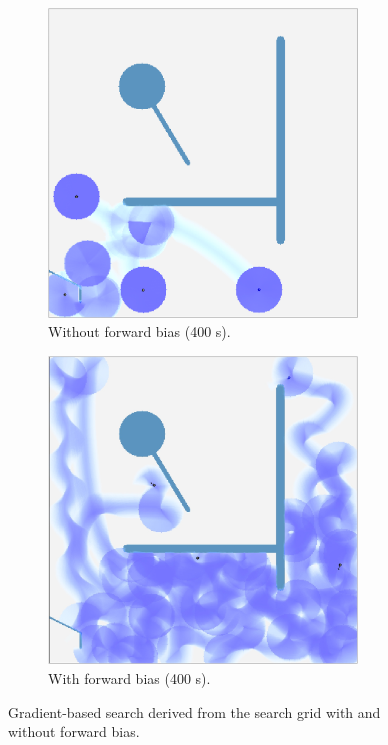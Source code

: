 \begin{figure}[H]
  \centering
  \begin{subfigure}[b]{0.45\textwidth}
    \centering
        \includegraphics[width=0.9\textwidth]{./figures/screenshots/without-forward.png}
    \caption{Without forward bias (400 s).}
    \label{fig:search-gradient-no-forward}
  \end{subfigure}
  \begin{subfigure}[b]{0.45\textwidth}
    \centering
    \includegraphics[width=0.9\textwidth]{./figures/screenshots/with-forward.jpeg}
    \caption{With forward bias (400 s).}
    \label{fig:search-gradient-forward}
  \end{subfigure}
  \caption{Gradient-based search derived from the search grid with and without forward bias.}
  \label{fig:gradient-forward-bias}
\end{figure}


